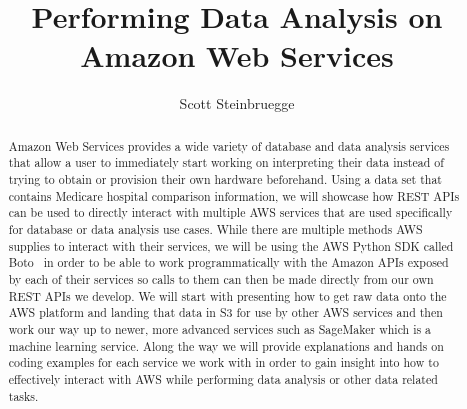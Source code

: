 
\title{Performing Data Analysis on Amazon Web Services}

\author{Scott Steinbruegge}


\renewcommand{\shortauthors}{S. Steinbruegge}


\begin{abstract}
Amazon Web Services provides a wide variety of database and data analysis
 services that allow a user to immediately start working on interpreting 
their data instead of trying to obtain or provision their own hardware 
beforehand. Using a data set that contains Medicare hospital comparison 
information, we will showcase how REST APIs can be used to directly interact 
with multiple AWS services that are used specifically for database or data 
analysis use cases. While there are multiple methods AWS supplies to interact 
with their services, we will be using the AWS Python SDK called 
Boto~\cite{hid-sp18-521-boto} in order to be able to work programmatically 
with the Amazon APIs exposed by each of their services so calls to them can 
then be made directly from our own REST APIs we develop. We will start with 
presenting how to get raw data onto the AWS platform and landing that data 
in S3 for use by other AWS services and then work our way up to newer, more 
advanced services such as SageMaker which is a machine learning service. 
Along the way we will provide explanations and hands on coding examples 
for each service we work with in order to gain insight into how to 
effectively interact with AWS while performing data analysis or other data 
related tasks. 
\end{abstract}



\maketitle



 

